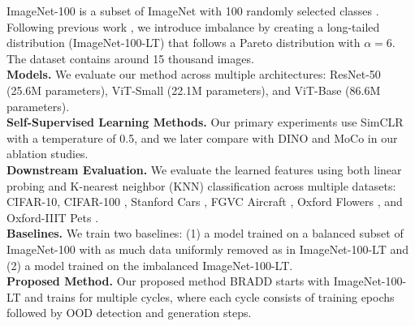 \noindent
ImageNet-100 is a subset of ImageNet with 100 randomly selected classes \cite{tian2020contrastive}. Following previous work \cite{imagenet-lt}, we introduce imbalance by creating a long-tailed distribution (ImageNet-100-LT) that follows a Pareto distribution with $\alpha=6$. The dataset contains around 15 thousand images.\\
\noindent
\textbf{Models.} We evaluate our method across multiple architectures: ResNet-50 (25.6M parameters), ViT-Small (22.1M parameters), and ViT-Base (86.6M parameters).\\
\noindent
\textbf{Self-Supervised Learning Methods.} Our primary experiments use SimCLR \cite{chen2020simple} with a temperature of 0.5, and we later compare with DINO \cite{DINO} and MoCo \cite{moco} in our ablation studies.\\
\noindent
\textbf{Downstream Evaluation.} We evaluate the learned features using both linear probing and K-nearest neighbor (KNN) classification across multiple datasets: CIFAR-10, CIFAR-100 \cite{krizhevsky2009learning}, Stanford Cars \cite{cars}, FGVC Aircraft \cite{aircraft}, Oxford Flowers \cite{flowers}, and Oxford-IIIT Pets \cite{pets}.\\
\noindent
\textbf{Baselines.} We train two baselines: (1) a model trained on a balanced subset of ImageNet-100 with as much data uniformly removed as in ImageNet-100-LT and (2) a model trained on the imbalanced ImageNet-100-LT.\\
\noindent
\textbf{Proposed Method.} Our proposed method BRADD starts with ImageNet-100-LT and trains for multiple cycles, where each cycle consists of training epochs followed by OOD detection and generation steps.
